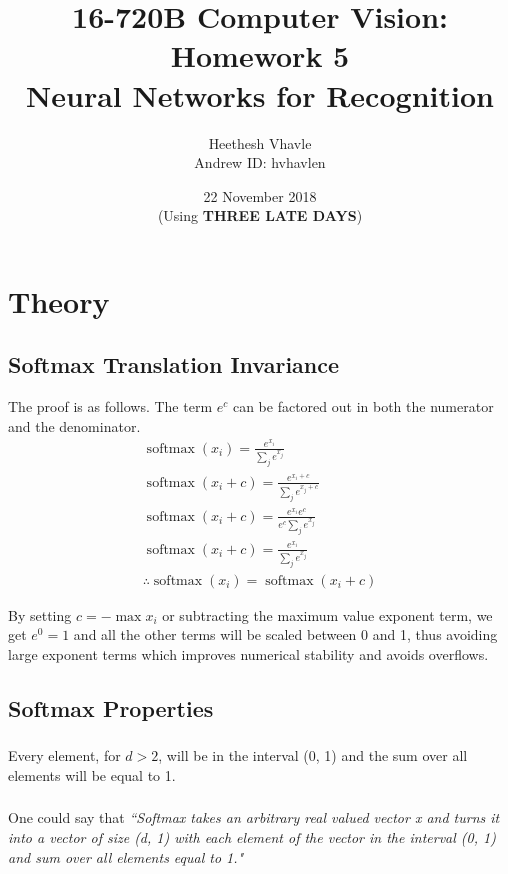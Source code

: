 \documentclass[a4paper]{article}
\title{16-720B Computer Vision: Homework 5 \\
Neural Networks for Recognition}
\author{Heethesh Vhavle\\
Andrew ID: hvhavlen}
\date{22 November 2018\\(Using \textbf{THREE LATE DAYS})}
\begin{document}
\maketitle

\section{Theory}
\subsection{Softmax Translation Invariance}
The proof is as follows. The term $e^{c}$ can be factored out in both the numerator and the denominator.
\begin{equation}
\begin{gathered}
    \operatorname { softmax } \left( x _ { i } \right) = \frac { e ^ { x _ { i } } } { \sum _ { j } e ^ { x _ { j } } } \\
    \operatorname { softmax } \left( x _ { i } + c \right) = \frac { e ^ { x _ { i } + c} } { \sum _ { j } e ^ { x _ { j } + c } } \\
    \operatorname { softmax } \left( x _ { i } + c \right) = \frac { e^{x_{ i }} e^{c} } { e^{c} \sum _ { j } e ^ { x _ { j } } } \\
    \operatorname { softmax } \left( x _ { i } + c \right) = \frac { e ^ { x _ { i } } } { \sum _ { j } e ^ { x _ { j } } } \\
    \therefore \operatorname { softmax } \left( x _ { i } \right) = \operatorname { softmax } \left( x _ { i } + c \right)
\end{gathered}
\end{equation}

By setting $c = - \max x _ { i }$ or subtracting the maximum value exponent term, we get $e^{0}=1$ and all the other terms will be scaled between 0 and 1, thus avoiding large exponent terms which improves numerical stability and avoids overflows.

\subsection{Softmax Properties}
\subsubsection{}
Every element, for $d>2$, will be in the interval (0, 1) and the sum over all elements will be equal to 1.

\subsubsection{}
One could say that \textit{``Softmax takes an arbitrary real valued vector x and turns it into a vector of size (d, 1) with each element of the vector in the interval (0, 1) and sum over all elements equal to 1."}
\end{document}
